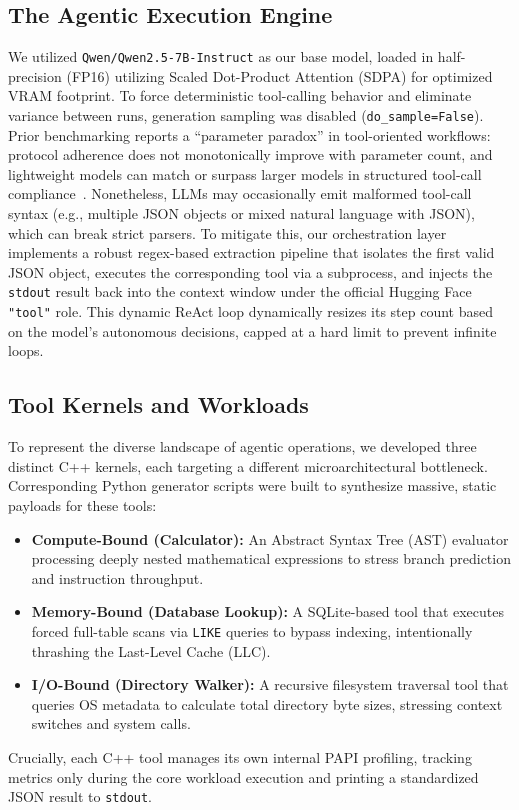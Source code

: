 \documentclass[10pt, letterpaper]{article}
\begin{document}
\subsection{The Agentic Execution Engine}
We utilized \texttt{Qwen/Qwen2.5-7B-Instruct} as our base model, loaded in half-precision (FP16) utilizing Scaled Dot-Product Attention (SDPA) for optimized VRAM footprint. To force deterministic tool-calling behavior and eliminate variance between runs, generation sampling was disabled (\texttt{do\_sample=False}).\\

\noindent Prior benchmarking reports a ``parameter paradox'' in tool-oriented workflows: protocol adherence does not monotonically improve with parameter count, and lightweight models can match or surpass larger models in structured tool-call compliance~\cite{ai_nativebench}. Nonetheless, LLMs may occasionally emit malformed tool-call syntax (e.g., multiple JSON objects or mixed natural language with JSON), which can break strict parsers. To mitigate this, our orchestration layer implements a robust regex-based extraction pipeline that isolates the first valid JSON object, executes the corresponding tool via a subprocess, and injects the \texttt{stdout} result back into the context window under the official Hugging Face \texttt{"tool"} role. This dynamic ReAct loop dynamically resizes its step count based on the model's autonomous decisions, capped at a hard limit to prevent infinite loops.

\subsection{Tool Kernels and Workloads}
To represent the diverse landscape of agentic operations, we developed three distinct C++ kernels, each targeting a different microarchitectural bottleneck. Corresponding Python generator scripts were built to synthesize massive, static payloads for these tools:
\begin{itemize}
\item \textbf{Compute-Bound (Calculator):} An Abstract Syntax Tree (AST) evaluator processing deeply nested mathematical expressions to stress branch prediction and instruction throughput.
\item \textbf{Memory-Bound (Database Lookup):} A SQLite-based tool that executes forced full-table scans via \texttt{LIKE} queries to bypass indexing, intentionally thrashing the Last-Level Cache (LLC).
\item \textbf{I/O-Bound (Directory Walker):} A recursive filesystem traversal tool that queries OS metadata to calculate total directory byte sizes, stressing context switches and system calls.
\end{itemize}
Crucially, each C++ tool manages its own internal PAPI profiling, tracking metrics only during the core workload execution and printing a standardized JSON result to \texttt{stdout}.
\end{document}
